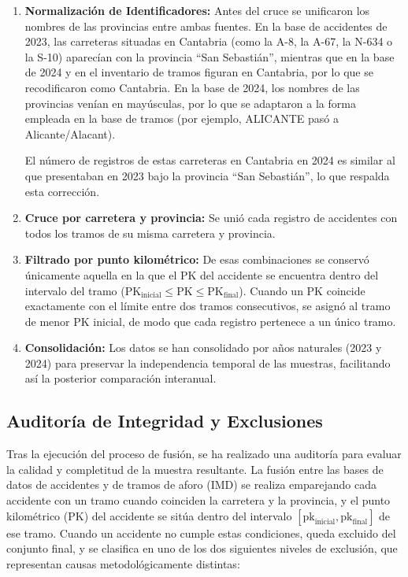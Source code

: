 \documentclass[twoside,a4paper,12pt,onecolumn,openany]{book}
\begin{document}
\begin{enumerate}
    \item \textbf{Normalización de Identificadores:} Antes del cruce se unificaron los nombres de las provincias entre ambas fuentes. En la base de accidentes de 2023, las carreteras situadas en Cantabria (como la A-8, la A-67, la N-634 o la S-10) aparecían con la provincia ``San Sebastián'', mientras que en la base de 2024 y en el inventario de tramos figuran en Cantabria, por lo que se recodificaron como Cantabria. En la base de 2024, los nombres de las provincias venían en mayúsculas, por lo que se adaptaron a la forma empleada en la base de tramos (por ejemplo, ALICANTE pasó a Alicante/Alacant).

    El número de registros de estas carreteras en Cantabria en 2024 es similar al que presentaban en 2023 bajo la provincia ``San Sebastián'', lo que respalda esta corrección.
    
    \item \textbf{Cruce por carretera y provincia:} Se unió cada registro de accidentes con todos los tramos de su misma carretera y provincia.
    
    \item \textbf{Filtrado por punto kilométrico:} De esas combinaciones se conservó únicamente aquella en la que el PK del accidente se encuentra dentro del intervalo del tramo ($\text{PK}_{\text{inicial}} \leq \text{PK} \leq \text{PK}_{\text{final}}$). Cuando un PK coincide exactamente con el límite entre dos tramos consecutivos, se asignó al tramo de menor PK inicial, de modo que cada registro pertenece a un único tramo.
    
    \item \textbf{Consolidación:} Los datos se han consolidado por años naturales (2023 y 2024) para preservar la independencia temporal de las muestras, facilitando así la posterior comparación interanual.
\end{enumerate}

\subsection{Auditoría de Integridad y Exclusiones}

Tras la ejecución del proceso de fusión, se ha realizado una auditoría para evaluar la calidad y completitud de la muestra resultante. La fusión entre las bases de datos de accidentes y de tramos de aforo (IMD) se realiza emparejando cada accidente con un tramo cuando coinciden la carretera y la provincia, y el punto kilométrico (PK) del accidente se sitúa dentro del intervalo $[\text{pk}_{\text{inicial}}, \text{pk}_{\text{final}}]$ de ese tramo. Cuando un accidente no cumple estas condiciones, queda excluido del conjunto final, y se clasifica en uno de los dos siguientes niveles de exclusión, que representan causas metodológicamente distintas:
\end{document}
